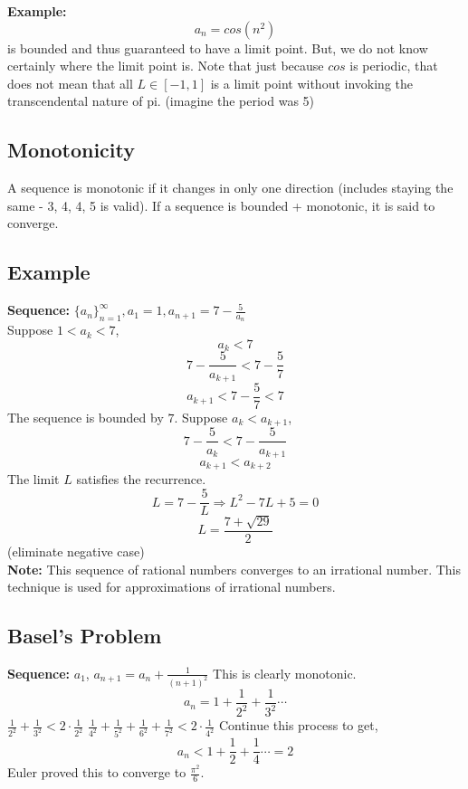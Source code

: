 \documentclass[../main.tex]{subfiles}
\begin{document}
        \noindent\textbf{Example:}
        $$a_{n}=cos(n^{2})$$
        is bounded and thus guaranteed to have a limit point. But, we do not know certainly where the
        limit point is. Note that just because $cos$ is periodic, that does not mean
        that all $L\in [-1, 1]$ is a limit point without invoking the transcendental nature of pi.
        (imagine the period was 5)

    \subsection{Monotonicity}
        A sequence is monotonic if it changes in only one direction (includes staying the same - 3, 4, 4, 5 is valid).
        If a sequence is bounded + monotonic, it is said to converge.

    \subsection{Example}
        \textbf{Sequence: } $\{a_{n}\}_{n=1}^{\infty}, a_{1}=1, a_{n+1}=7-\frac{5}{a_{n}}$\\
        Suppose $1<a_{k}<7$,
        $$a_{k}<7$$
        $$7-\frac{5}{a_{k+1}}<7-\frac{5}{7}$$
        $$a_{k+1}<7-\frac{5}{7}<7$$
        The sequence is bounded by $7$.
        Suppose $a_{k}<a_{k+1}$,
        $$7-\frac{5}{a_{k}}<7-\frac{5}{a_{k+1}}$$
        $$a_{k+1}<a_{k+2}$$
        The limit $L$ satisfies the recurrence.
        $$L=7-\frac{5}{L} \Rightarrow L^{2}-7L+5=0$$
        $$L=\frac{7+\sqrt{29}}{2}$$ (eliminate negative case)\\
    
    \noindent\textbf{Note: }This sequence of rational numbers converges to an irrational number.
        This technique is used for approximations of irrational numbers.

    \subsection{Basel's Problem}
        \textbf{Sequence: } $a_{1}$, $a_{n+1}=a_{n}+\frac{1}{(n+1)^{2}}$
        This is clearly monotonic.
        $$a_{n}=1+\frac{1}{2^{2}}+\frac{1}{3^{2}}\cdots$$
        $\frac{1}{2^{2}}+\frac{1}{3^2}<2\cdot \frac{1}{2^2}$
        $\frac{1}{4^{2}}+\frac{1}{5^{2}}+\frac{1}{6^{2}}+\frac{1}{7^{2}}<2\cdot\frac{1}{4^{2}}$
        Continue this process to get,
        $$a_{n}<1+\frac{1}{2}+\frac{1}{4}\cdots=2$$
        Euler proved this to converge to $\frac{\pi^{2}}{6}$.
\end{document}
